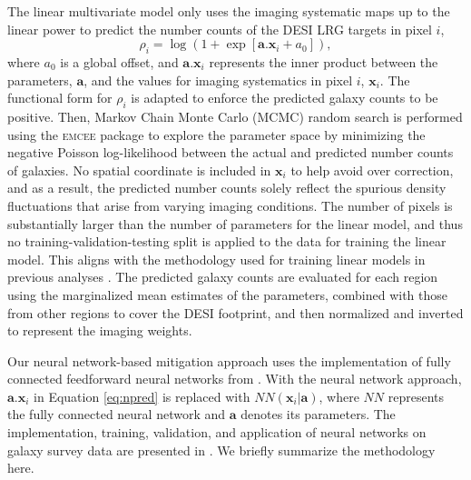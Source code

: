 The linear multivariate model only uses the imaging systematic maps up to the linear power to predict the number counts of the DESI LRG targets in pixel $i$,
\begin{equation}\label{eq:npred}
    \rho_{i} = \log ( 1 + \exp[\textbf{a}.\textbf{x}_{i}+a_{0}]),
\end{equation}
where $a_{0}$ is a global offset, and $\textbf{a}.\textbf{x}_{i}$ represents the inner product between the parameters, $\textbf{a}$, and the values for imaging systematics in pixel $i$, $\textbf{x}_{i}$. The functional form for $\rho_{i}$ is adapted to enforce the predicted galaxy counts to be positive. Then, Markov Chain Monte Carlo (MCMC) random search is performed using the \textsc{emcee} package \citep{2013PASP..125..306F} to explore the parameter space by minimizing the negative Poisson log-likelihood between the actual and predicted number counts of galaxies. No spatial coordinate is included in $\textbf{x}_{i}$ to help avoid over correction, and as a result, the predicted number counts solely reflect the spurious density fluctuations that arise from varying imaging conditions. The number of pixels is substantially larger than the number of parameters for the linear model, and thus no training-validation-testing split is applied to the data for training the linear model. This aligns with the methodology used for training linear models in previous analyses \citep[see, e.g.,][]{zhou2022target}. The predicted galaxy counts are evaluated for each region using the marginalized mean estimates of the parameters, combined with those from other regions to cover the DESI footprint, and then normalized and inverted to represent the imaging weights.


Our neural network-based mitigation approach uses the implementation of fully connected feedforward neural networks from \cite{rezaie2021primordial}. With the neural network approach, $\textbf{a}.\textbf{x}_{i}$ in Equation \ref{eq:npred} is replaced with $NN(\textbf{x}_{i}|\textbf{a})$, where $NN$ represents the fully connected neural network and $\textbf{a}$ denotes its parameters. The implementation, training, validation, and application of neural networks on galaxy survey data are presented in \cite{rezaie2021primordial}. We briefly summarize the methodology here. 

